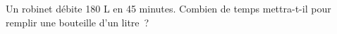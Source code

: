\documentclass[exercice]{thedocument}%
\begin{document}
%
Un robinet débite 180 L en 45 minutes. Combien de temps mettra-t-il pour
remplir une bouteille d'un litre~?
\end{document}
